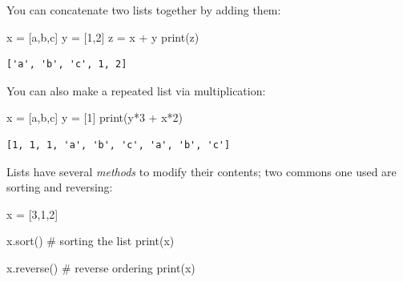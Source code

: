 \documentclass[
  letterpaper,
]{scrbook}
\newenvironment{Shaded}{\begin{snugshade}}{\end{snugshade}}
\newcommand{\BuiltInTok}[1]{\textcolor[rgb]{0.00,0.23,0.31}{#1}}
\newcommand{\CommentTok}[1]{\textcolor[rgb]{0.37,0.37,0.37}{#1}}
\newcommand{\DecValTok}[1]{\textcolor[rgb]{0.68,0.00,0.00}{#1}}
\newcommand{\NormalTok}[1]{\textcolor[rgb]{0.00,0.23,0.31}{#1}}
\newcommand{\OperatorTok}[1]{\textcolor[rgb]{0.37,0.37,0.37}{#1}}
\newcommand{\StringTok}[1]{\textcolor[rgb]{0.13,0.47,0.30}{#1}}
\begin{document}
You can concatenate two lists together by adding them:

\begin{Shaded}
\begin{Highlighting}[]
\NormalTok{x }\OperatorTok{=}\NormalTok{ [}\StringTok{\textquotesingle{}a\textquotesingle{}}\NormalTok{,}\StringTok{\textquotesingle{}b\textquotesingle{}}\NormalTok{,}\StringTok{\textquotesingle{}c\textquotesingle{}}\NormalTok{]}
\NormalTok{y }\OperatorTok{=}\NormalTok{ [}\DecValTok{1}\NormalTok{,}\DecValTok{2}\NormalTok{]}
\NormalTok{z }\OperatorTok{=}\NormalTok{ x }\OperatorTok{+}\NormalTok{ y}
\BuiltInTok{print}\NormalTok{(z)}
\end{Highlighting}
\end{Shaded}

\begin{verbatim}
['a', 'b', 'c', 1, 2]
\end{verbatim}

You can also make a repeated list via multiplication:

\begin{Shaded}
\begin{Highlighting}[]
\NormalTok{x }\OperatorTok{=}\NormalTok{ [}\StringTok{\textquotesingle{}a\textquotesingle{}}\NormalTok{,}\StringTok{\textquotesingle{}b\textquotesingle{}}\NormalTok{,}\StringTok{\textquotesingle{}c\textquotesingle{}}\NormalTok{]}
\NormalTok{y }\OperatorTok{=}\NormalTok{ [}\DecValTok{1}\NormalTok{]}
\BuiltInTok{print}\NormalTok{(y}\OperatorTok{*}\DecValTok{3} \OperatorTok{+}\NormalTok{ x}\OperatorTok{*}\DecValTok{2}\NormalTok{)}
\end{Highlighting}
\end{Shaded}

\begin{verbatim}
[1, 1, 1, 'a', 'b', 'c', 'a', 'b', 'c']
\end{verbatim}

Lists have several \emph{methods} to modify their contents; two commons
one used are sorting and reversing:

\begin{Shaded}
\begin{Highlighting}[]
\NormalTok{x }\OperatorTok{=}\NormalTok{ [}\DecValTok{3}\NormalTok{,}\DecValTok{1}\NormalTok{,}\DecValTok{2}\NormalTok{]}

\NormalTok{x.sort() }\CommentTok{\# sorting the list}
\BuiltInTok{print}\NormalTok{(x)}

\NormalTok{x.reverse() }\CommentTok{\# reverse ordering}
\BuiltInTok{print}\NormalTok{(x)}
\end{Highlighting}
\end{Shaded}
\end{document}
